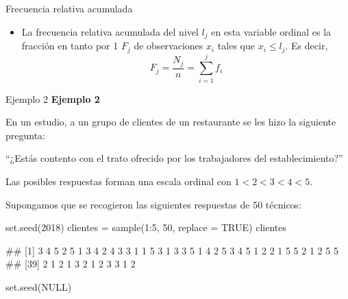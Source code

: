 \documentclass[
  ignorenonframetext,
  aspectratio=169]{beamer}
\newenvironment{Shaded}{\begin{snugshade}}{\end{snugshade}}
\newcommand{\AttributeTok}[1]{\textcolor[rgb]{0.77,0.63,0.00}{#1}}
\newcommand{\ConstantTok}[1]{\textcolor[rgb]{0.00,0.00,0.00}{#1}}
\newcommand{\DecValTok}[1]{\textcolor[rgb]{0.00,0.00,0.81}{#1}}
\newcommand{\FunctionTok}[1]{\textcolor[rgb]{0.00,0.00,0.00}{#1}}
\newcommand{\NormalTok}[1]{#1}
\newcommand{\OtherTok}[1]{\textcolor[rgb]{0.56,0.35,0.01}{#1}}
\newcommand{\SpecialCharTok}[1]{\textcolor[rgb]{0.00,0.00,0.00}{#1}}
\providecommand{\tightlist}{%
  \setlength{\itemsep}{0pt}\setlength{\parskip}{0pt}}
\let\oldverbatim\verbatim
\let\endoldverbatim\endverbatim
\renewenvironment{verbatim}{\tiny\oldverbatim}{\endoldverbatim}
\begin{document}
\begin{frame}{Frecuencia relativa acumulada}
\protect\hypertarget{frecuencia-relativa-acumulada-2}{}
\begin{itemize}
\tightlist
\item
  La frecuencia relativa acumulada del nivel \(l_j\) en esta variable
  ordinal es la fracción en tanto por 1 \(F_j\) de observaciones \(x_i\)
  tales que \(x_i\le l_j\). Es decir,
  \[F_j=\frac{N_j}{n}=\sum_{i=1}^jf_i\]
\end{itemize}
\end{frame}

\begin{frame}[fragile]{Ejemplo 2}
\protect\hypertarget{ejemplo-2}{}
\textbf{Ejemplo 2}

En un estudio, a un grupo de clientes de un restaurante se les hizo la
siguiente pregunta:

``¿Estás contento con el trato ofrecido por los trabajadores del
establecimiento?''

Las posibles respuestas forman una escala ordinal con \(1<2<3<4<5\).

Supongamos que se recogieron las siguientes respuestas de 50 técnicos:

\begin{Shaded}
\begin{Highlighting}[]
\FunctionTok{set.seed}\NormalTok{(}\DecValTok{2018}\NormalTok{)}
\NormalTok{clientes }\OtherTok{=} \FunctionTok{sample}\NormalTok{(}\DecValTok{1}\SpecialCharTok{:}\DecValTok{5}\NormalTok{, }\DecValTok{50}\NormalTok{, }\AttributeTok{replace =} \ConstantTok{TRUE}\NormalTok{)}
\NormalTok{clientes}
\end{Highlighting}
\end{Shaded}

\begin{verbatim}
##  [1] 3 4 5 2 5 1 3 4 2 4 3 3 1 1 5 3 1 3 3 5 1 4 2 5 3 4 5 1 2 2 1 5 5 2 1 2 5 5
## [39] 2 1 2 1 3 2 1 2 3 3 1 2
\end{verbatim}

\begin{Shaded}
\begin{Highlighting}[]
\FunctionTok{set.seed}\NormalTok{(}\ConstantTok{NULL}\NormalTok{)}
\end{Highlighting}
\end{Shaded}
\end{frame}
\end{document}
